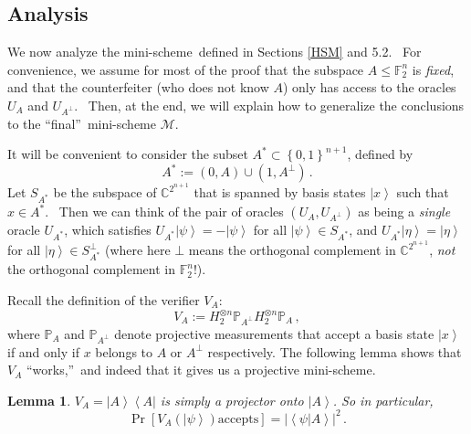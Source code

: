 \documentclass[10pt]{article}
\newtheorem{lemma}[theorem]{Lemma}
\theoremstyle{definition}
\numberwithin{equation}{section}
\begin{document}
\subsection{Analysis\label{ANALYSIS}}

We now analyze the mini-scheme\ defined in Sections \ref{HSM} and 5.2.
\ For convenience, we assume for most of the proof that the subspace
$A\leq\mathbb{F}_{2}^{n}$ is \emph{fixed}, and that the counterfeiter (who
does not know $A$) only has access to the oracles $U_{A}$ and $U_{A^{\bot}}$.
\ Then, at the end, we will explain how to generalize the conclusions to the
\textquotedblleft final\textquotedblright\ mini-scheme $\mathcal{M}$.

It will be convenient to consider the subset $A^{\ast}\subset\left\{
0,1\right\}  ^{n+1}$, defined by%
\[
A^{\ast}:=\left(  0,A\right)  \cup(1,A^{\bot})\,.
\]
Let $S_{A^{\ast}}$ be the subspace of $\mathbb{C}^{2^{n+1}}$ that is spanned
by basis states $\left\vert x\right\rangle $ such that $x\in A^{\ast}$.
\ Then we can think of the pair of oracles $\left(  U_{A},U_{A^{\bot}}\right)
$ as being a \emph{single} oracle $U_{A^{\ast}}$, which satisfies
$U_{A^{\ast}}\left\vert \psi\right\rangle =-\left\vert \psi\right\rangle
$ for all $\left\vert \psi\right\rangle \in S_{A^{\ast}}$, and $U_{A^{\ast}%
}\left\vert \eta\right\rangle =\left\vert \eta\right\rangle $ for all
$\left\vert \eta\right\rangle \in S_{A^{\ast}}^{\bot}$ (where here $\bot
$ means the orthogonal complement in $\mathbb{C}^{2^{n+1}}$, \emph{not} the
orthogonal complement in $\mathbb{F}_{2}^{n}$!).

Recall the definition of the verifier $V_{A}$:%
\[
V_{A}:=H_{2}^{\otimes n}\mathbb{P}_{A^{\bot}}H_{2}^{\otimes n}\mathbb{P}_{A}\,,
\]
where $\mathbb{P}_{A}$ and $\mathbb{P}_{A^{\bot}}$ denote projective
measurements that accept a basis state $\left\vert x\right\rangle $ if and
only if $x$ belongs to $A$ or $A^{\bot}$ respectively. The following lemma
shows that $V_{A}$ \textquotedblleft works,\textquotedblright\ and indeed that
it gives us a projective mini-scheme.

\begin{lemma}
\label{testworks}$V_{A}=\left\vert A\right\rangle \left\langle A\right\vert $
is simply a projector onto $\left\vert A\right\rangle $. So in particular,
\[
\Pr\left[  V_{A}\left(  \left\vert \psi\right\rangle \right)  \text{
accepts}\right]  =\left\vert \left\langle \psi|A\right\rangle \right\vert
^{2}\,.
\]
\end{lemma}
\end{document}
